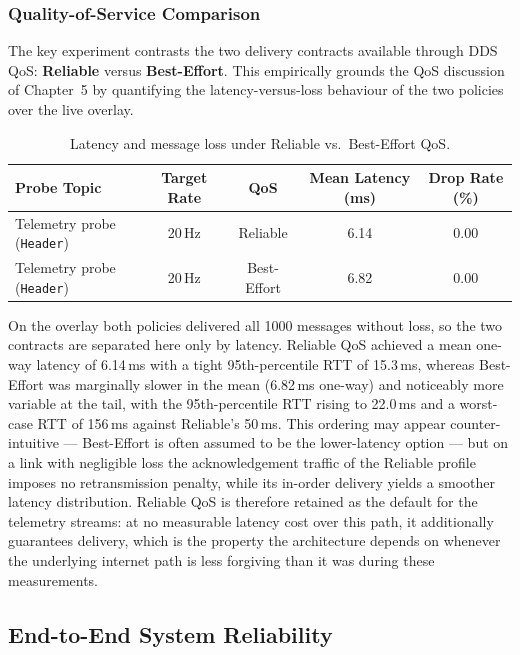 \subsubsection{Quality-of-Service Comparison}

The key experiment contrasts the two delivery contracts available through DDS QoS: \textbf{Reliable} versus \textbf{Best-Effort}. This empirically grounds the QoS discussion of Chapter~5 by quantifying the latency-versus-loss behaviour of the two policies over the live overlay.

\begin{table}[htbp]
    \centering
    \caption{Latency and message loss under Reliable vs.\ Best-Effort QoS.}
    \label{tab:qos_comparison}
    \begin{tabular}{lcccc}
        \toprule
        \textbf{Probe Topic} & \textbf{Target Rate} & \textbf{QoS} & \textbf{Mean Latency (ms)} & \textbf{Drop Rate (\%)} \\
        \midrule
        Telemetry probe (\texttt{Header}) & 20\,Hz & Reliable     & 6.14 & 0.00 \\
        Telemetry probe (\texttt{Header}) & 20\,Hz & Best-Effort  & 6.82 & 0.00 \\
        \bottomrule
    \end{tabular}
\end{table}

On the overlay both policies delivered all 1000 messages without loss, so the two contracts are separated here only by latency. Reliable QoS achieved a mean one-way latency of 6.14\,ms with a tight 95th-percentile RTT of 15.3\,ms, whereas Best-Effort was marginally slower in the mean (6.82\,ms one-way) and noticeably more variable at the tail, with the 95th-percentile RTT rising to 22.0\,ms and a worst-case RTT of 156\,ms against Reliable's 50\,ms. This ordering may appear counter-intuitive --- Best-Effort is often assumed to be the lower-latency option --- but on a link with negligible loss the acknowledgement traffic of the Reliable profile imposes no retransmission penalty, while its in-order delivery yields a smoother latency distribution. Reliable QoS is therefore retained as the default for the telemetry streams: at no measurable latency cost over this path, it additionally guarantees delivery, which is the property the architecture depends on whenever the underlying internet path is less forgiving than it was during these measurements.

\subsection{End-to-End System Reliability}

